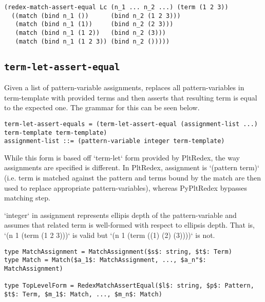 \begin{lstlisting}
(redex-match-assert-equal Lc (n_1 ... n_2 ...) (term (1 2 3))
  ((match (bind n_1 ())      (bind n_2 (1 2 3)))
   (match (bind n_1 (1))     (bind n_2 (2 3)))
   (match (bind n_1 (1 2))   (bind n_2 (3)))
   (match (bind n_1 (1 2 3)) (bind n_2 ()))))
\end{lstlisting}



\subsection{\texttt{term-let-assert-equal}}

Given a list of pattern-variable assignments, replaces all pattern-variables in term-template with provided terms and then asserts that resulting term is equal to the expected one. The grammar for this can be seen below. 

\begin{lstlisting}
term-let-assert-equals = (term-let-assert-equal (assignment-list ...) term-template term-template)
assignment-list ::= (pattern-variable integer term-template)
\end{lstlisting}

While this form is based off `term-let` form provided by PltRedex, the way assignments are specified is different. In PltRedex, assignment is `(pattern term)` (i.e. term is matched against the pattern and terms bound by the match are then used to replace appropriate pattern-variables), whereas PyPltRedex bypasses matching step. 

`integer` in assignment represents ellipis depth of the pattern-variable and assumes that related term is well-formed with respect to ellipsis depth. That is, `(n 1 (term (1 2 3)))` is valid but `(n 1 (term ((1) (2) (3))))` is not.




\begin{lstlisting}
type MatchAssignment = MatchAssignment($s$: string, $t$: Term)
type Match = Match($a_1$: MatchAssignment, ..., $a_n"$: MatchAssignment)

type TopLevelForm = RedexMatchAssertEqual($l$: string, $p$: Pattern, $t$: Term, $m_1$: Match, ..., $m_n$: Match)
\end{lstlisting}

